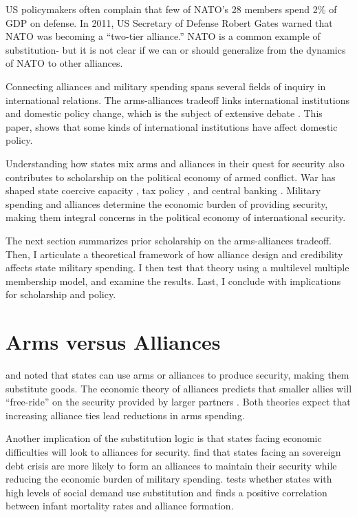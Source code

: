 \documentclass[12pt]{article}
\begin{document}
US policymakers often complain that few of NATO's 28 members spend 2\% of GDP on defense. In 2011, US Secretary of Defense Robert Gates warned that NATO was becoming a ``two-tier alliance.'' NATO is a common example of substitution- but it is not clear if we can or should generalize from the dynamics of NATO to other alliances. 

Connecting alliances and military spending spans several fields of inquiry in international relations. The arms-alliances tradeoff links international institutions and domestic policy change, which is the subject of extensive debate \citep{DownsRockeBarsoom1996, FuhrmannLupu2016, Martin1998}. This paper, shows that some kinds of international institutions have affect domestic policy. 

Understanding how states mix arms and alliances in their quest for security also contributes to scholarship on the political economy of armed conflict. War has shaped state coercive capacity \citep{Bean1973, Tilly1990}, tax policy \citep{Dinceccoetal2011, ScheveStasavage2012}, and central banking \citep{Poast2015}. Military spending and alliances determine the economic burden of providing security, making them integral concerns in the political economy of international security.  

The next section summarizes prior scholarship on the arms-alliances tradeoff. Then, I articulate a theoretical framework of how alliance design and credibility affects state military spending. I then test that theory using a multilevel multiple membership model, and examine the results. Last, I conclude with implications for scholarship and policy.  

\section*{Arms versus Alliances}


\citet{Altfield1984} and \citet{Morrow1993} noted that states can use arms or alliances to produce security, making them substitute goods. The economic theory of alliances predicts that smaller allies will ``free-ride'' on the security provided by larger partners \citep{OlsonZeckhauser1966, SandlerHartley2001, Lake2009}. Both theories expect that increasing alliance ties lead reductions in arms spending. 

Another implication of the substitution logic is that states facing economic difficulties will look to alliances for security. \citet{AllenDigiuseppe2013} find that states facing an sovereign debt crisis are more likely to form an alliances to maintain their security while reducing the economic burden of military spending. \citet{Kimball2010} tests whether states with high levels of social demand use substitution and finds a positive correlation between infant mortality rates and alliance formation. 
\end{document}

